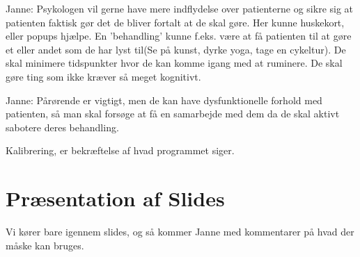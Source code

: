Janne: Psykologen vil gerne have mere indflydelse over patienterne og sikre sig at patienten faktisk gør det de bliver fortalt at de skal gøre. Her kunne huskekort, eller popups hjælpe. En 'behandling' kunne f.eks. være at få patienten til at gøre et eller andet som de har lyst til(Se på kunst, dyrke yoga, tage en cykeltur). De skal minimere tidspunkter hvor de kan komme igang med at ruminere. De skal gøre ting som ikke kræver så meget kognitivt. 

Janne: Pårørende er vigtigt, men de kan have dysfunktionelle forhold med patienten, så man skal forsøge at få en samarbejde med dem da de skal aktivt sabotere deres behandling. 

Kalibrering, er bekræftelse af hvad programmet siger. 

\section{Præsentation af Slides}
Vi kører bare igennem slides, og så kommer Janne med kommentarer på hvad der måske kan bruges.

